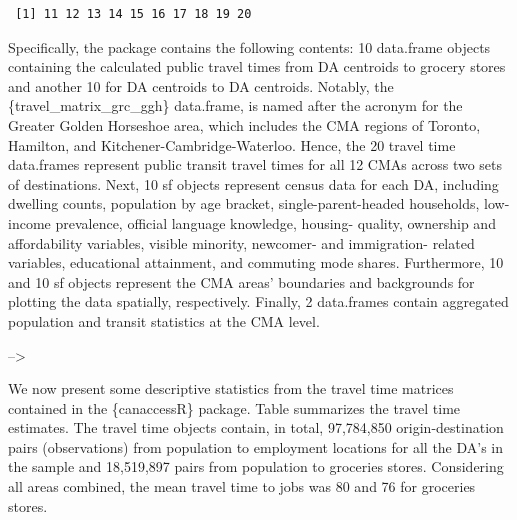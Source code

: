 \documentclass[Royal,times,sageh]{sagej}
\begin{document}
\begin{verbatim}
 [1] 11 12 13 14 15 16 17 18 19 20
\end{verbatim}

Specifically, the package contains the following contents: 10 data.frame
objects containing the calculated public travel times from DA centroids
to grocery stores and another 10 for DA centroids to DA centroids.
Notably, the \{travel\_matrix\_grc\_ggh\} data.frame, is named after the
acronym for the Greater Golden Horseshoe area, which includes the CMA
regions of Toronto, Hamilton, and Kitchener-Cambridge-Waterloo. Hence,
the 20 travel time data.frames represent public transit travel times for
all 12 CMAs across two sets of destinations. Next, 10 sf objects
represent census data for each DA, including dwelling counts, population
by age bracket, single-parent-headed households, low-income prevalence,
official language knowledge, housing- quality, ownership and
affordability variables, visible minority, newcomer- and immigration-
related variables, educational attainment, and commuting mode shares.
Furthermore, 10 and 10 sf objects represent the CMA areas' boundaries
and backgrounds for plotting the data spatially, respectively. Finally,
2 data.frames contain aggregated population and transit statistics at
the CMA level.

--\textgreater{}

We now present some descriptive statistics from the travel time matrices
contained in the \{canaccessR\} package. Table \citet{tbl-table_1}
summarizes the travel time estimates. The travel time objects contain,
in total, 97,784,850 origin-destination pairs (observations) from
population to employment locations for all the DA's in the sample and
18,519,897 pairs from population to groceries stores. Considering all
areas combined, the mean travel time to jobs was 80 and 76 for groceries
stores.
\end{document}
